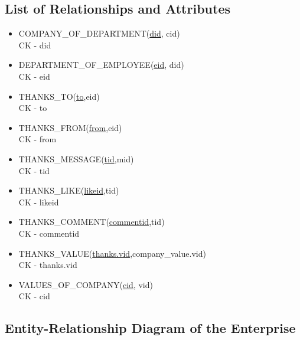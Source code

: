 \documentclass[11pt]{report}
\begin{document}
\subsection{List of Relationships and Attributes}
\begin{itemize}
\item COMPANY\_OF\_DEPARTMENT(\underline{did}, cid) \\
CK - did \\
\item DEPARTMENT\_OF\_EMPLOYEE(\underline{eid}, did) \\
CK - eid \\
\item THANKS\_TO(\underline{to},eid) \\
CK - to\\
\item THANKS\_FROM(\underline{from},eid) \\
CK - from\\
\item THANKS\_MESSAGE(\underline{tid},mid) \\
CK - tid\\
\item THANKS\_LIKE(\underline{likeid},tid) \\
CK - likeid\\
\item THANKS\_COMMENT(\underline{commentid},tid) \\
CK - commentid\\
\item THANKS\_VALUE(\underline{thanks.vid},company\_value.vid) \\
CK - thanks.vid\\
\item VALUES\_OF\_COMPANY(\underline{cid}, vid) \\
CK - cid
\end{itemize}
\clearpage

\subsection{Entity-Relationship Diagram of the Enterprise}
\end{document}
